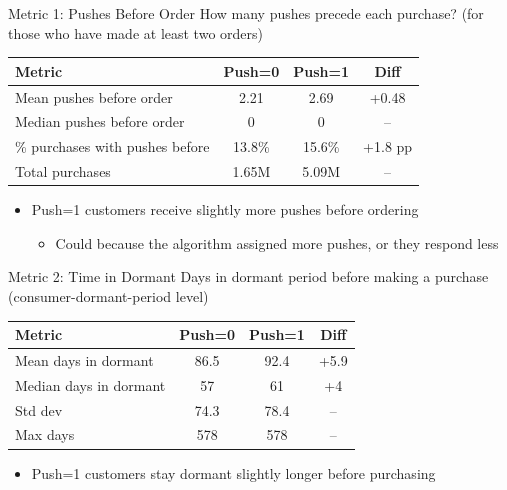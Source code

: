 \documentclass[aspectratio=169]{beamer}  %
\begin{document}
\begin{frame}{Metric 1: Pushes Before Order}
How many pushes precede each purchase? (for those who have made at least two orders)
\vspace{0.2cm}

\begin{table}
\centering
\small
\begin{tabular}{lccc}
\toprule
\textbf{Metric} & \textbf{Push=0} & \textbf{Push=1} & \textbf{Diff} \\
\midrule
Mean pushes before order & 2.21 & 2.69 & +0.48 \\
Median pushes before order & 0 & 0 & -- \\
\% purchases with pushes before & 13.8\% & 15.6\% & +1.8 pp \\
Total purchases & 1.65M & 5.09M & -- \\
\bottomrule
\end{tabular}
\end{table}

\begin{itemize}
    \item Push=1 customers receive slightly more pushes before ordering
    \begin{itemize}
        \item Could because the algorithm assigned more pushes, or they respond less
    \end{itemize}
\end{itemize}
\end{frame}

\begin{frame}{Metric 2: Time in Dormant}
Days in dormant period before making a purchase (consumer-dormant-period level)
\vspace{0.2cm}

\begin{table}
\centering
\small
\begin{tabular}{lccc}
\toprule
\textbf{Metric} & \textbf{Push=0} & \textbf{Push=1} & \textbf{Diff} \\
\midrule
Mean days in dormant & 86.5 & 92.4 & +5.9 \\
Median days in dormant & 57 & 61 & +4 \\
Std dev & 74.3 & 78.4 & -- \\
Max days & 578 & 578 & -- \\
\bottomrule
\end{tabular}
\end{table}

\begin{itemize}
    \item Push=1 customers stay dormant slightly longer before purchasing
\end{itemize}
\end{frame}
\end{document}
